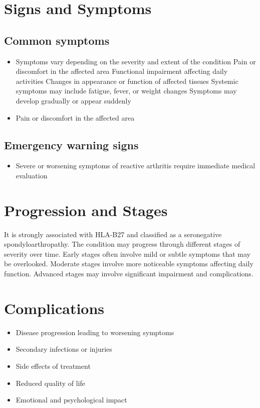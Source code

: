 \section{Signs and Symptoms}

\subsection{Common symptoms}
\begin{itemize}[noitemsep]
  \item Symptoms vary depending on the severity and extent of the condition Pain or discomfort in the affected area Functional impairment affecting daily activities Changes in appearance or function of affected tissues Systemic symptoms may include fatigue, fever, or weight changes Symptoms may develop gradually or appear suddenly
  \item Pain or discomfort in the affected area
  \end{itemize}

\subsection{Emergency warning signs}
\begin{itemize}[noitemsep]
  \item Severe or worsening symptoms of reactive arthritis require immediate medical evaluation
\end{itemize}
\section{Progression and Stages}
It is strongly associated with HLA-B27 and classified as a seronegative spondyloarthropathy. The condition may progress through different stages of severity over time. Early stages often involve mild or subtle symptoms that may be overlooked. Moderate stages involve more noticeable symptoms affecting daily function. Advanced stages may involve significant impairment and complications.
\section{Complications}
\begin{itemize}[noitemsep]
  \item Disease progression leading to worsening symptoms
  \item Secondary infections or injuries
  \item Side effects of treatment
  \item Reduced quality of life
  \item Emotional and psychological impact
\end{itemize}
